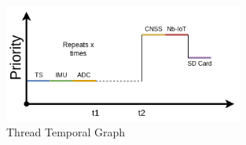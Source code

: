 \begin{figure}[H]
    \centering
    \includegraphics[width=0.7\textwidth]{images/diagrams/threads/graph/threads_graph.drawio.png}  %
    \caption{Thread Temporal Graph}
    \label{fig:Thread Temporal Graph}        
\end{figure}